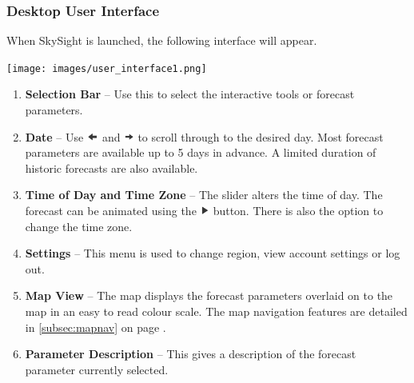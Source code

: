 \documentclass[11pt,a4paper]{article}
\begin{document}
\subsubsection{Desktop User Interface}
When SkySight is launched, the following interface will appear.
\begin{center}
\texttt{[image: images/user\_interface1.png]}
\end{center}
\begin{enumerate}
\item \textbf{Selection Bar} -- Use this to select the interactive tools or forecast parameters.
\item \textbf{Date}  -- Use \includegraphics[height=9pt]{images/icons/previous.png} and \includegraphics[height=9pt]{images/icons/next.png}  to scroll through to the desired day. Most forecast parameters are available up to 5 days in advance. A limited duration of historic forecasts are also available.
\item \textbf{Time of Day and Time Zone} -- The slider alters the time of day. The forecast can be animated using the \includegraphics[height=9pt]{images/icons/play.png} button. There is also the option to change the time zone.
\item \textbf{Settings} -- This menu is used to change region, view account settings or log out.
\item \textbf{Map View} -- The map displays the forecast parameters overlaid on to the map in an easy to read colour scale. The map navigation features are detailed in \ref{subsec:mapnav} on page \pageref{subsec:mapnav}.
\item \textbf{Parameter Description} -- This gives a description of the forecast parameter currently selected.
\end{enumerate}
\end{document}

